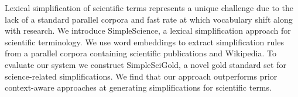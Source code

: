 Lexical simplification of scientific terms represents a unique challenge due to the lack of a standard parallel corpora and fast rate at which vocabulary shift along with research. We introduce SimpleScience, a lexical simplification approach for scientific terminology. We use word embeddings to extract simplification rules from a parallel corpora containing scientific publications and Wikipedia. To evaluate our system we construct SimpleSciGold, a novel gold standard set for science-related simplifications. We find that our approach outperforms prior context-aware approaches at generating simplifications for scientific terms.
